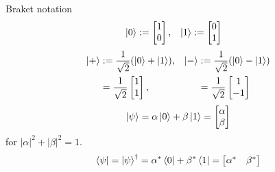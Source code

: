 \documentclass{beamer}
\begin{document}
\begin{frame}{Braket notation}
\begin{align*}
\ket{0} &:= \begin{bmatrix}1\\0\end{bmatrix},&
\ket{1} &:= \begin{bmatrix}0\\1\end{bmatrix}
\end{align*}
\begin{align*}
\ket{+} &:=\frac1{\sqrt{2}}(\ket{0}+\ket{1}),&
\ket{-} &:=\frac1{\sqrt{2}}(\ket{0}-\ket{1})\\
&= \frac1{\sqrt{2}}\begin{bmatrix}1\\1\end{bmatrix},&
&= \frac1{\sqrt{2}}\begin{bmatrix}1\\-1\end{bmatrix}
\end{align*}
\begin{align*}
\ket{\psi} = \alpha\ket{0}+\beta\ket{1}=\begin{bmatrix}\alpha\\\beta\end{bmatrix}
\end{align*}
for $|\alpha|^2+|\beta|^2=1$.
\begin{align*}
\bra{\psi} = \ket{\psi}^\dagger = \alpha^*\bra{0}+\beta^*\bra{1}=\begin{bmatrix}\alpha^*&\beta^*\end{bmatrix}
\end{align*}
\end{frame}
\end{document}
